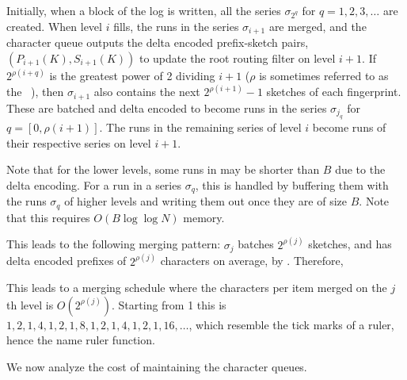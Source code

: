 Initially, when a block of the log is written, all the series $\sigma_{2^q}$
for $q=1,2,3,\ldots$ are created. When level $i$ fills, the runs in the series
$\sigma_{i+1}$ are merged, and the character queue outputs the delta encoded
prefix-sketch pairs, $(P_{i+1}(K),S_{i+1}(K))$ to update the root routing
filter on level $i+1$. If $2^{\rho(i+q)}$ is the greatest power of 2 dividing
$i+1$ ($\rho$ is sometimes referred to as the ~\cite{wiki:Thomae's_function}), then $\sigma_{i+1}$ also contains the
next $2^{\rho(i+1)}-1$ sketches of each fingerprint. These are batched and
delta encoded to become runs in the series $\sigma_{j_q}$ for $q =
[0,\rho(i+1)]$. The runs in the remaining series of level $i$ become runs of
their respective series on level $i+1$.

Note that for the lower levels, some runs in may  be shorter than $B$ due to the
delta encoding. For a run in a series $\sigma_q$, this is handled by buffering
them with the runs $\sigma_q$ of higher levels and writing them out once they
are of size $B$. Note that this requires $O(B\log\log N)$ memory.

This leads to the following merging pattern: $\sigma_j$ batches $2^{\rho(j)}$
sketches, and has delta encoded prefixes of $2^{\rho(j)}$ characters on average,
by .  Therefore,


This leads to a merging schedule where the characters per item merged on the
$j$th level is $O(2^{\rho(j)})$. Starting from 1 this is
$1,2,1,4,1,2,1,8,1,2,1,4,1,2,1,16,\ldots$, which resemble the tick marks of a
ruler, hence the name ruler function.

We now analyze the cost of maintaining the character queues.


